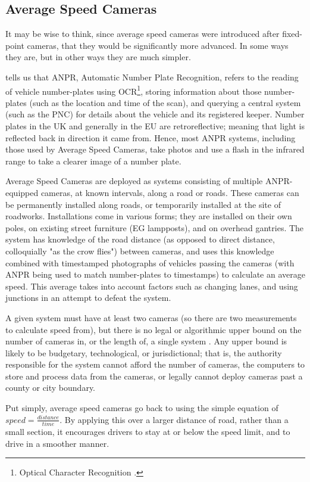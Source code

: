\documentclass[11pt, a4paper, notitlepage]{report}
\begin{document}
\subsection{Average Speed Cameras}
It may be wise to think, since average speed cameras were introduced after fixed-point cameras, that they would be significantly more advanced. In some ways they are, but in other ways they are much simpler.

\citet{ANPRNPCC} tells us that ANPR, Automatic Number Plate Recognition, refers to the reading of vehicle number-plates using OCR\footnote{Optical Character Recognition \citep{OCR}.}, storing information about those number-plates (such as the location and time of the scan), and querying a central system (such as the PNC) for details about the vehicle and its registered keeper. Number plates in the UK and generally in the EU are retroreflective; meaning that light is reflected back in direction it came from. Hence, most ANPR systems, including those used by Average Speed Cameras, take photos and use a flash in the infrared range to take a clearer image of a number plate.

Average Speed Cameras are deployed as systems consisting of multiple ANPR-equipped cameras, at known intervals, along a road or roads. These cameras can be permanently installed along roads, or temporarily installed at the site of roadworks. Installations come in various forms; they are installed on their own poles, on existing street furniture (EG lampposts), and on overhead gantries. The system has knowledge of the road distance (as opposed to direct distance, colloquially "as the crow flies") between cameras, and uses this knowledge combined with timestamped photographs of vehicles passing the cameras (with ANPR being used to match number-plates to timestamps) to calculate an average speed. This average takes into account factors such as changing lanes, and using junctions in an attempt to defeat the system.

A given system must have at least two cameras (so there are two measurements to calculate speed from), but there is no legal or algorithmic upper bound on the number of cameras in, or the length of, a single system \citep{cbASC}. Any upper bound is likely to be budgetary, technological, or jurisdictional; that is, the authority responsible for the system cannot afford the number of cameras, the computers to store and process data from the cameras, or legally cannot deploy cameras past a county or city boundary.

Put simply, average speed cameras go back to using the simple equation of $ speed = \frac{distance}{time} $. By applying this over a larger distance of road, rather than a small section, it encourages drivers to stay at or below the speed limit, and to drive in a smoother manner.
\end{document}
